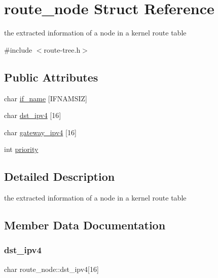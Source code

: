 \hypertarget{structroute__node}{}\section{route\+\_\+node Struct Reference}
\label{structroute__node}


the extracted information of a node in a kernel route table  




{\ttfamily \#include $<$route-\/tree.\+h$>$}

\subsection*{Public Attributes}
\begin{DoxyCompactItemize}
\item 
char \hyperlink{structroute__node_a4be6a66a552d88f360585c636ee70680}{if\+\_\+name} \mbox{[}I\+F\+N\+A\+M\+S\+IZ\mbox{]}
\item 
char \hyperlink{structroute__node_a27a750349a740654f57ad08fe87ff83f}{dst\+\_\+ipv4} \mbox{[}16\mbox{]}
\item 
char \hyperlink{structroute__node_a17ee301a4563560e6b7262dff9c8c0b8}{gateway\+\_\+ipv4} \mbox{[}16\mbox{]}
\item 
int \hyperlink{structroute__node_a43cbb1b4e49fd4a12395fa28a9febecc}{priority}
\end{DoxyCompactItemize}


\subsection{Detailed Description}
the extracted information of a node in a kernel route table 

\subsection{Member Data Documentation}
\mbox{\label{structroute__node_a27a750349a740654f57ad08fe87ff83f}} 
\subsubsection{\texorpdfstring{dst\+\_\+ipv4}{dst\_ipv4}}
{\footnotesize\ttfamily char route\+\_\+node\+::dst\+\_\+ipv4\mbox{[}16\mbox{]}}

